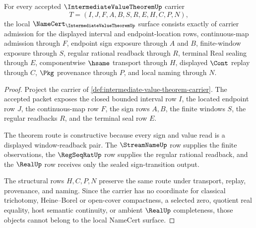 \begin{theorem}
\label{thm:intermediate-value-theorem-namecert-obligations}
For every accepted $\IntermediateValueTheoremUp$ carrier
$$
T=(I,J,F,A,B,S,R,E,H,C,P,N),
$$
the local $\NameCert_{\IntermediateValueTheoremUp}$ surface consists exactly of carrier admission for the displayed interval and endpoint-location rows, continuous-map admission through $F$, endpoint sign exposure through $A$ and $B$, finite-window exposure through $S$, regular rational readback through $R$, terminal Real sealing through $E$, componentwise $\hsame$ transport through $H$, displayed $\Cont$ replay through $C$, $\Pkg$ provenance through $P$, and local naming through $N$.
\end{theorem}
\begin{proof}
Project the carrier of \autoref{def:intermediate-value-theorem-carrier}. The accepted packet exposes the closed bounded interval row $I$, the located endpoint row $J$, the continuous-map row $F$, the sign rows $A,B$, the finite windows $S$, the regular readbacks $R$, and the terminal seal row $E$.

The theorem route is constructive because every sign and value read is a displayed window-readback pair. The $\StreamNameUp$ row supplies the finite observations, the $\RegSeqRatUp$ row supplies the regular rational readback, and the $\RealUp$ row receives only the sealed sign-transition output.

The structural rows $H,C,P,N$ preserve the same route under transport, replay, provenance, and naming. Since the carrier has no coordinate for classical trichotomy, Heine--Borel or open-cover compactness, a selected zero, quotient real equality, host semantic continuity, or ambient $\RealUp$ completeness, those objects cannot belong to the local NameCert surface.
\end{proof}


